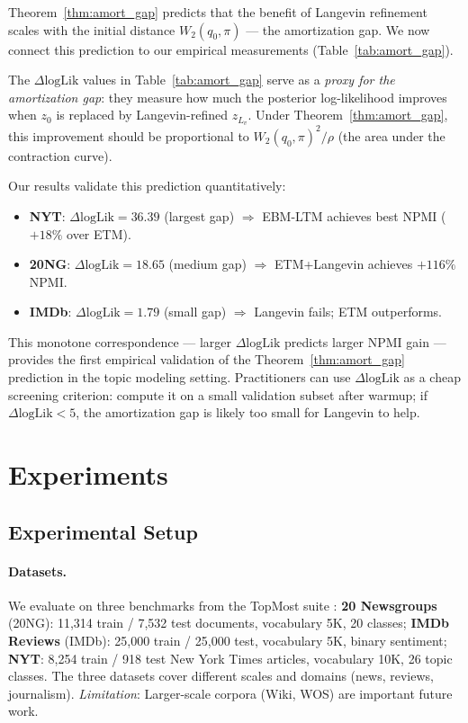 \documentclass[10pt]{article}
\begin{document}
Theorem~\ref{thm:amort_gap} predicts that the benefit of Langevin refinement scales with
the initial distance $W_2(q_0, \pi)$ — the amortization gap.
We now connect this prediction to our empirical measurements (Table~\ref{tab:amort_gap}).

The $\Delta\mathrm{logLik}$ values in Table~\ref{tab:amort_gap} serve as a
\emph{proxy for the amortization gap}: they measure how much the posterior log-likelihood
improves when $z_0$ is replaced by Langevin-refined $z_{L_v}$.
Under Theorem~\ref{thm:amort_gap}, this improvement should be proportional to
$W_2(q_0, \pi)^2 / \rho$ (the area under the contraction curve).

Our results validate this prediction quantitatively:
\begin{itemize}
    \item \textbf{NYT}: $\Delta\mathrm{logLik} = 36.39$ (largest gap) $\Rightarrow$ EBM-LTM achieves best NPMI ($+18\%$ over ETM).
    \item \textbf{20NG}: $\Delta\mathrm{logLik} = 18.65$ (medium gap) $\Rightarrow$ ETM+Langevin achieves $+116\%$ NPMI.
    \item \textbf{IMDb}: $\Delta\mathrm{logLik} = 1.79$ (small gap) $\Rightarrow$ Langevin fails; ETM outperforms.
\end{itemize}

This monotone correspondence — larger $\Delta\mathrm{logLik}$ predicts larger NPMI gain —
provides the first empirical validation of the Theorem~\ref{thm:amort_gap} prediction
in the topic modeling setting. Practitioners can use $\Delta\mathrm{logLik}$ as a cheap
screening criterion: compute it on a small validation subset after warmup; if
$\Delta\mathrm{logLik} < 5$, the amortization gap is likely too small for Langevin to help.

\section{Experiments}
\label{sec:experiments}

\subsection{Experimental Setup}

\paragraph{Datasets.}
We evaluate on three benchmarks from the TopMost suite \citep{wu2023topmost}:
\textbf{20 Newsgroups} (20NG): 11,314 train / 7,532 test documents, vocabulary 5K, 20 classes;
\textbf{IMDb Reviews} (IMDb): 25,000 train / 25,000 test, vocabulary 5K, binary sentiment;
\textbf{NYT}: 8,254 train / 918 test New York Times articles, vocabulary 10K, 26 topic classes.
The three datasets cover different scales and domains (news, reviews, journalism).
\emph{Limitation}: Larger-scale corpora (Wiki, WOS) are important future work.
\end{document}
